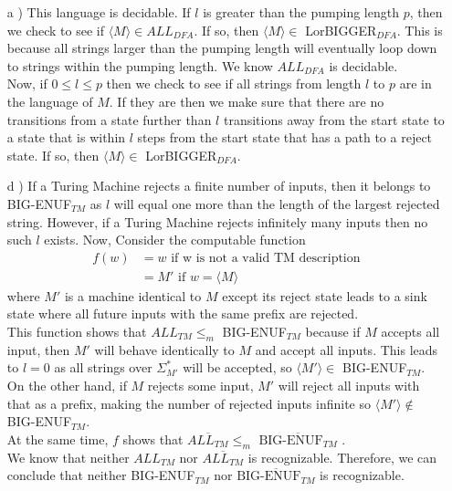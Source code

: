 
\begin{solution}

\begin{itemize}
	\item [a]) This language is decidable. If $l$ is greater than the pumping length $p$, then we check to see if $\langle M \rangle \in ALL_{DFA}$. If so, then $\langle M \rangle \in $ LorBIGGER$_{DFA}$. This is because all strings larger than the pumping length will eventually loop down to strings within the pumping length. We know $ALL_{DFA}$ is decidable.\\
	Now, if $0 \le l \le p$ then we check to see if all strings from length $l$ to $p$ are in the language of $M$. If they are then we make sure that there are no transitions from a state further than $l$ transitions away from the start state to a state that is within $l$ steps from the start state that has a path to a reject state. If so, then $\langle M \rangle \in $ LorBIGGER$_{DFA}$. 
	\item [d]) If a Turing Machine rejects a finite number of inputs, then it belongs to BIG-ENUF$_{TM}$ as $l$ will equal one more than the length of the largest rejected string. However, if a Turing Machine rejects infinitely many inputs then no such $l$ exists. Now, Consider the computable function
	\begin{align*}
		f(w) &= w \mbox{ if w is not a valid TM description}\\
		&= M' \mbox{ if } w =\langle M \rangle
	\end{align*}
	where $M'$ is a machine identical to $M$ except its reject state leads to a sink state where all future inputs with the same prefix are rejected.\\
	This function shows that $ALL_{TM} \le_m $ BIG-ENUF$_{TM}$ because if $M$ accepts all input, then $M'$ will behave identically to $M$ and accept all inputs. This leads to $l = 0$ as all strings over $\Sigma^*_{M'}$ will be accepted, so $\langle M' \rangle \in $ BIG-ENUF$_{TM}$. On the other hand, if $M$ rejects some input, $M'$ will reject all inputs with that as a prefix, making the number of rejected inputs infinite so $\langle M' \rangle \notin $ BIG-ENUF$_{TM}$.\\
	At the same time, $f$ shows that $\overline{ALL_{TM}} \le_m $ $\overline{\mbox{BIG-ENUF}_{TM}}$ .\\
	We know that neither $ALL_{TM}$ nor $\overline{ALL_{TM}}$ is recognizable. Therefore, we can conclude that neither BIG-ENUF$_{TM}$ nor $\overline{\mbox{BIG-ENUF}_{TM}}$ is recognizable.
\end{itemize}

\end{solution}
